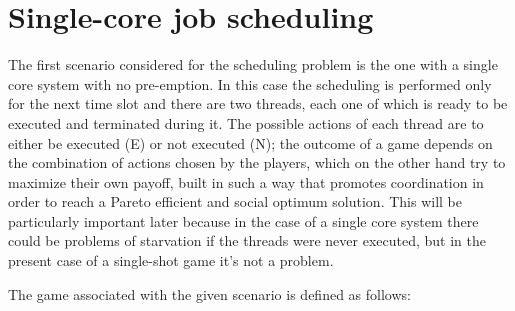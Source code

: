\section{Single-core job scheduling}

The first scenario considered for the scheduling problem is the one with a
single core system with no pre-emption. In this case the scheduling is
performed only for the next time slot and there are two threads, each one of
which is ready to be executed and terminated during it. The possible actions
of each thread are to either be executed (E) or not executed (N); the
outcome of a game depends on the combination of actions chosen by the players,
which on the other hand try to maximize their own payoff, built in such a way
that promotes coordination in order to reach a Pareto efficient and social
optimum solution. This will be particularly important later because in the case of a
single core system there could be problems of starvation if the threads were
never executed, but in the present case of a single-shot game it's not a problem.

The game associated with the given scenario is defined as follows:

